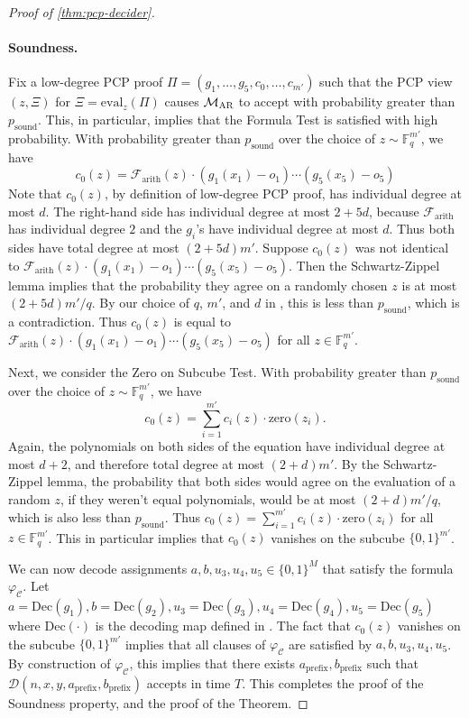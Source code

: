\documentclass[11pt]{article}
\theoremstyle{definition}
\newcommand{\F}{\ensuremath{\mathbb{F}}}
\newcommand{\decider}{\mathcal{D}}
\newcommand{\gamestyle}[1]{\ensuremath{\textsc{#1}}\xspace}
\newcommand{\ar}{\gamestyle{AR}}
\newcommand{\eval}{\mathrm{eval}}
\newcommand{\circuit}{\mathcal{C}}
\newcommand{\formula}{\mathcal{F}}
\newcommand{\pcpverifier}{\mathcal{M}_\ar}
\newcommand{\coded}{\mathrm{Dec}}
\newcommand{\soundness}{\mathrm{sound}}
\begin{document}
\begin{proof}[Proof of \cref{thm:pcp-decider}]
\paragraph{Soundness.}
Fix a low-degree PCP proof $\Pi = (g_1,\ldots,g_5,c_0,\ldots,c_{m'})$ such that
the PCP view $(z,\Xi)$ for $\Xi = \eval_z(\Pi)$ causes $\pcpverifier$ to accept
with probability greater than $p_\soundness$.
This, in particular, implies that the Formula Test is satisfied with high
probability.
With probability greater than $p_\soundness$ over the choice of $z \sim
\F_q^{m'}$, we have
\[
  c_0(z) = \formula_{\mathrm{arith}} (z) \cdot (g_1(x_1) - o_1) \cdots (g_5(x_5)- o_5)
\]
Note that $c_0(z)$, by definition of low-degree PCP proof, has individual degree
at most $d$.
The right-hand side has individual degree at most $2 + 5d$, because
$\formula_{\mathrm{arith}}$ has individual degree $2$ and the $g_i$'s have
individual degree at most $d$.
Thus both sides have total degree at most $(2 + 5d)m'$.
Suppose $c_0(z)$ was not identical to $\formula_{\mathrm{arith}} (z) \cdot
(g_1(x_1) - o_1) \cdots (g_5(x_5)- o_5)$.
Then the Schwartz-Zippel lemma implies that the probability they agree on a
randomly chosen $z$ is at most $(2 + 5d)m'/q$.
By our choice of $q$, $m'$, and $d$ in , this is less than
$p_\soundness$, which is a contradiction.
Thus $c_0(z)$ is equal to $\formula_{\mathrm{arith}} (z) \cdot (g_1(x_1) - o_1)
\cdots (g_5(x_5)- o_5)$ for all $z\in \F_q^{m'}$.
    
Next, we consider the Zero on Subcube Test.
With probability greater than $p_\soundness$ over the choice of $z \sim
\F_q^{m'}$, we have
\[
  c_0(z) = \sum_{i=1}^{m'} c_i(z) \cdot \mathrm{zero}(z_i).
\]
Again, the polynomials on both sides of the equation have individual degree at
most $d+2$, and therefore total degree at most $(2 + d)m'$.
By the Schwartz-Zippel lemma, the probability that both sides would agree on the
evaluation of a random $z$, if they weren't equal polynomials, would be at most
$(2 + d)m'/q$, which is also less than $p_\soundness$.
Thus $c_0(z) = \sum_{i=1}^{m'} c_i(z) \cdot \mathrm{zero}(z_i)$ for all $z \in
\F_q^{m'}$.
This in particular implies that $c_0(z)$ vanishes on the subcube $\{0,1\}^{m'}$. 
    
We can now decode assignments $a,b,u_3,u_4,u_5 \in \{0,1\}^M$ that satisfy the
formula $\varphi_\circuit$.
Let $a = \coded(g_1), b = \coded(g_2), u_3 = \coded(g_3), u_4 = \coded(g_4), u_5
= \coded(g_5)$ where $\coded(\cdot)$ is the decoding map defined in
.
The fact that $c_0(z)$ vanishes on the subcube $\{0,1\}^{m'}$ implies that all
clauses of $\varphi_\circuit$ are satisfied by $a,b,u_3,u_4,u_5$.
By construction of $\varphi_\circuit$, this implies that there exists
$a_{\mathrm{prefix}}, b_{\mathrm{prefix}}$ such that
$\decider(n,x,y,a_{\mathrm{prefix}},b_{\mathrm{prefix}})$ accepts in time $T$.
This completes the proof of the Soundness property, and the proof of the
Theorem.
\end{proof}
\end{document}
